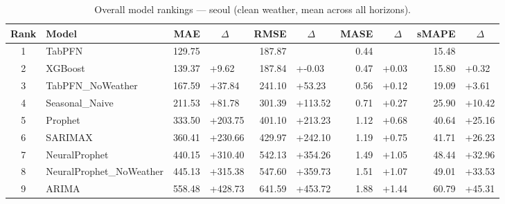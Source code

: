 \begin{table}[ht!]
\centering
\caption{Overall model rankings — seoul (clean weather, mean across all horizons).}
\label{tab:overall_rankings_seoul}
{\small
\setlength{\tabcolsep}{3pt}
\scriptsize
\begin{tabular}{clrlrlrlrl}
\toprule
Rank & Model & MAE & ~~\(\Delta\) & RMSE & ~~\(\Delta\) & MASE & ~~\(\Delta\) & sMAPE & ~~\(\Delta\) \\
\midrule
1 & TabPFN & 129.75 &  & 187.87 &  & 0.44 &  & 15.48 &  \\
2 & XGBoost & 139.37 & +9.62 & 187.84 & +-0.03 & 0.47 & +0.03 & 15.80 & +0.32 \\
3 & TabPFN_NoWeather & 167.59 & +37.84 & 241.10 & +53.23 & 0.56 & +0.12 & 19.09 & +3.61 \\
4 & Seasonal_Naive & 211.53 & +81.78 & 301.39 & +113.52 & 0.71 & +0.27 & 25.90 & +10.42 \\
5 & Prophet & 333.50 & +203.75 & 401.10 & +213.23 & 1.12 & +0.68 & 40.64 & +25.16 \\
6 & SARIMAX & 360.41 & +230.66 & 429.97 & +242.10 & 1.19 & +0.75 & 41.71 & +26.23 \\
7 & NeuralProphet & 440.15 & +310.40 & 542.13 & +354.26 & 1.49 & +1.05 & 48.44 & +32.96 \\
8 & NeuralProphet_NoWeather & 445.13 & +315.38 & 547.60 & +359.73 & 1.51 & +1.07 & 49.01 & +33.53 \\
9 & ARIMA & 558.48 & +428.73 & 641.59 & +453.72 & 1.88 & +1.44 & 60.79 & +45.31 \\
\bottomrule
\end{tabular}
}
\end{table}
